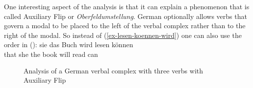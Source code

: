 One interesting aspect of the analysis is that it can explain a phenomenon that is called Auxiliary
Flip or \emph{Oberfeldumstellung}. German optionally allows verbs that govern a modal to be placed
to the left of the verbal complex rather than to the right of the modal. So instead of
(\ref{ex-lesen-koennen-wird}) one can also use the order in ():
\ea
\gll [dass] sie das Buch wird lesen können\\
     \spacebr{}that she the book will read can\\
\z
\begin{figure}
\caption{\label{fig-wird-lesen-koennen}Analysis of a German verbal complex with three verbs with
  Auxiliary Flip}
\end{figure}


